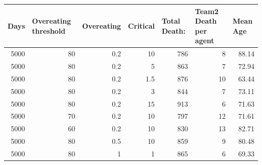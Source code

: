 \begin{table}[]
\begin{adjustbox}{width=\columnwidth,center}
\begin{tabular}{@{}rrrrrrr@{}}
\toprule
\multicolumn{1}{l}{Days} & \multicolumn{1}{l}{Overeating threshold} & \multicolumn{1}{l}{Overeating} & \multicolumn{1}{l}{Critical} & \multicolumn{1}{l}{Total Death:} & \multicolumn{1}{l}{Team2 Death per agent} & \multicolumn{1}{l}{Mean Age} \\ \midrule
5000                     & 80                                       & 0.2                            & 10                           & 786                              & 8                                         & 88.14                        \\
5000                     & 80                                       & 0.2                            & 5                            & 863                              & 7                                         & 72.94                        \\
5000                     & 80                                       & 0.2                            & 1.5                          & 876                              & 10                                        & 63.44                        \\
5000                     & 80                                       & 0.2                            & 3                            & 844                              & 7                                         & 73.11                        \\
5000                     & 80                                       & 0.2                            & 15                           & 913                              & 6                                         & 71.63                        \\
5000                     & 70                                       & 0.2                            & 10                           & 797                              & 12                                        & 71.61                        \\
5000                     & 60                                       & 0.2                            & 10                           & 830                              & 13                                        & 82.71                        \\
5000                     & 80                                       & 0.5                            & 10                           & 859                              & 9                                         & 80.48                        \\
5000                     & 80                                       & 1                              & 1                            & 865                              & 6                                         & 69.33                        \\ \bottomrule
\end{tabular}
\end{adjustbox}
\end{table}

